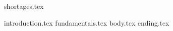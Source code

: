 \documentclass[runningheads]{llncs}
\begin{document}


{shortages.tex}


{introduction.tex}
{fundamentals.tex}
{body.tex}
{ending.tex}



\printbibliography

\end{document}
